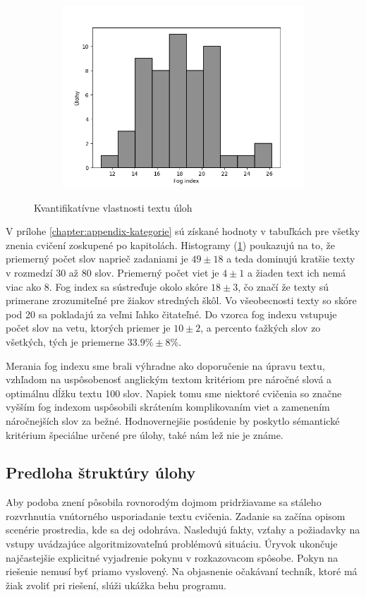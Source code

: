 \begin{figure}[h]
\begin{subfigure}[b]{0.32\textwidth}
\includegraphics[width=\textwidth]{assets/fog.png}
\end{subfigure}
\hfill
\caption{Kvantifikatívne vlastnosti textu úloh}
\label{fig:text-metrics}
\end{figure}

V prílohe \ref{chapter:appendix-kategorie} sú získané hodnoty v tabuľkách pre všetky znenia cvičení zoskupené po kapitolách. Histogramy (\ref{fig:text-metrics}) poukazujú na to, že priemerný počet slov naprieč zadaniami je $49 \pm 18$ a teda dominujú kratšie texty v rozmedzí $30$ až $80$ slov. Priemerný počet viet je $4 \pm 1$ a žiaden text ich nemá viac ako $8$. Fog index sa sústreďuje okolo skóre $18 \pm 3$, čo značí že texty sú primerane zrozumiteľné pre žiakov stredných škôl. Vo všeobecnosti texty so skóre pod 20 sa pokladajú za veľmi ľahko čitateľné. Do vzorca fog indexu vstupuje počet slov na vetu, ktorých priemer je $10 \pm 2$, a percento ťažkých slov zo všetkých, tých je priemerne $33.9\% \pm 8\%$.

Merania fog indexu sme brali výhradne ako doporučenie na úpravu textu, vzhľadom na uspôsobenosť anglickým textom kritériom pre náročné slová a optimálnu dĺžku textu 100 slov. Napiek tomu sme niektoré cvičenia so značne vyšším fog indexom uspôsobili skrátením komplikovaním viet a zamenením náročnejších slov za bežné. Hodnovernejšie posúdenie by poskytlo sémantické kritérium špeciálne určené pre úlohy, také nám lež nie je známe.

\subsection{Predloha štruktúry úlohy}
Aby podoba znení pôsobila rovnorodým dojmom pridržiavame sa stáleho rozvrhnutia vnútorného usporiadanie textu cvičenia. Zadanie sa začína opisom scenérie prostredia, kde sa dej odohráva. Nasledujú fakty, vzťahy a požiadavky na vstupy uvádzajúce algoritmizovateľnú problémovú situáciu. Úryvok ukončuje najčastejšie explicitné vyjadrenie pokynu v rozkazovacom spôsobe. Pokyn na riešenie nemusí byť priamo vyslovený. Na objasnenie očakávaní techník, ktoré má žiak zvoliť pri riešení, slúži ukážka behu programu.

